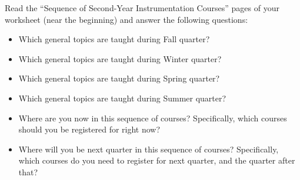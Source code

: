 

Read the ``Sequence of Second-Year Instrumentation Courses'' pages of your worksheet (near the beginning) and answer the following questions:

\vskip 10pt

\begin{itemize}
\item{} Which general topics are taught during Fall quarter?
\vskip 10pt
\item{} Which general topics are taught during Winter quarter?
\vskip 10pt
\item{} Which general topics are taught during Spring quarter?
\vskip 10pt
\item{} Which general topics are taught during Summer quarter?
\vskip 10pt
\item{} Where are you now in this sequence of courses?  Specifically, which courses should you be registered for right now?
\vskip 10pt
\item{} Where will you be next quarter in this sequence of courses?  Specifically, which courses do you need to register for next quarter, and the quarter after that?
\end{itemize}


















